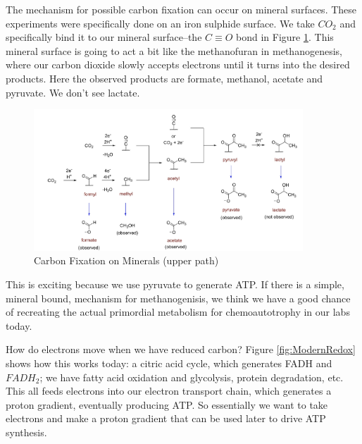 \documentclass[]{article}
\begin{document}
The mechanism for possible carbon fixation can occur on mineral surfaces. These experiments were specifically done on an iron sulphide surface. We take $CO_2$ and specifically bind it to our mineral surface--the $C\equiv O$ bond in Figure \ref{fig:CarbonFixationMinerals}. This mineral surface is going to act a bit like the methanofuran in methanogenesis, where our carbon dioxide slowly accepts electrons until it turns into the desired products. Here the observed products are formate, methanol, acetate and pyruvate. We don't see lactate.
  
\begin{figure}[H]
	\caption[Carbon Fixation on Minerals]{Carbon Fixation on Minerals (upper path)\cite{varma2018native} } \label{fig:CarbonFixationMinerals} 
	\includegraphics[width=0.9\textwidth]{CarbonFixationMinerals}
\end{figure}

This is exciting because we use pyruvate to generate ATP.
If there is a simple, mineral bound, mechanism for methanogenisis, we think we have a good chance of recreating the actual primordial metabolism for chemoautotrophy in our labs today.

How do electrons move when we have reduced carbon? Figure \ref{fig:ModernRedox} shows how this works today: a citric acid cycle, which generates FADH and $FADH_2$; we have fatty acid oxidation and glycolysis, protein degradation, etc. This all feeds electrons into our electron transport chain, which generates a proton gradient, eventually producing ATP. So essentially we want to take electrons and make a proton gradient that can be used later to drive ATP synthesis.
\end{document}

